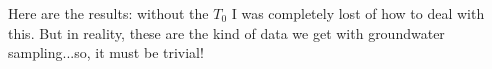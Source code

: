 \documentclass{tufte-handout}
\begin{document}
\begin{figure}
	\label{fig:IMG_0578}
\end{figure}

\begin{figure}
	\label{fig:IMG_0576}
\end{figure}

\begin{figure}
	\label{fig:IMG_0579}
\end{figure}


\begin{figure}
	\label{fig:IMG_0577}
\end{figure}

Here are the results: without the $T_0$ I was completely lost of how to deal with this. But in reality, these are the kind of data we get with groundwater sampling...so, it must be trivial!
\end{document}
